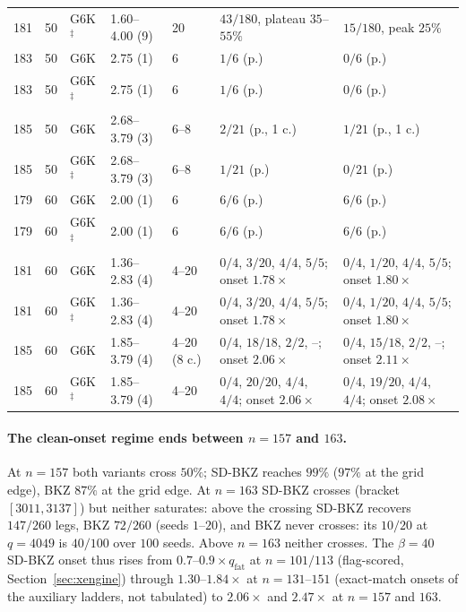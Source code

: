 \documentclass[journal=cic,version=preprint]{iacrj}
\begin{document}
\begin{table}[tbp]
\begin{tabular}{rrlllll}
181 & 50 & G6K$^\ddagger$ & 1.60--4.00 (9) & 20 & $43/180$, plateau $35$--$55\%$ & $15/180$, peak $25\%$ \\
183 & 50 & G6K & 2.75 (1) & 6 & $1/6$ (p.) & $0/6$ (p.) \\
183 & 50 & G6K$^\ddagger$ & 2.75 (1) & 6 & $1/6$ (p.) & $0/6$ (p.) \\
185 & 50 & G6K & 2.68--3.79 (3) & 6--8 & $2/21$ (p., 1 c.) & $1/21$ (p., 1 c.) \\
185 & 50 & G6K$^\ddagger$ & 2.68--3.79 (3) & 6--8 & $1/21$ (p.) & $0/21$ (p.) \\
\midrule
179 & 60 & G6K & 2.00 (1) & 6 & $6/6$ (p.) & $6/6$ (p.) \\
179 & 60 & G6K$^\ddagger$ & 2.00 (1) & 6 & $6/6$ (p.) & $6/6$ (p.) \\
181 & 60 & G6K & 1.36--2.83 (4) & 4--20 & $0/4$, $3/20$, $4/4$, $5/5$; onset $1.78\times$ & $0/4$, $1/20$, $4/4$, $5/5$; onset $1.80\times$ \\
181 & 60 & G6K$^\ddagger$ & 1.36--2.83 (4) & 4--20 & $0/4$, $3/20$, $4/4$, $5/5$; onset $1.78\times$ & $0/4$, $1/20$, $4/4$, $5/5$; onset $1.80\times$ \\
185 & 60 & G6K & 1.85--3.79 (4) & 4--20 (8 c.) & $0/4$, $18/18$, $2/2$, --; onset $2.06\times$ & $0/4$, $15/18$, $2/2$, --; onset $2.11\times$ \\
185 & 60 & G6K$^\ddagger$ & 1.85--3.79 (4) & 4--20 & $0/4$, $20/20$, $4/4$, $4/4$; onset $2.06\times$ & $0/4$, $19/20$, $4/4$, $4/4$; onset $2.08\times$ \\
\bottomrule
\end{tabular}
\end{table}

\paragraph{The clean-onset regime ends between $n=157$ and $163$.}
At $n=157$ both variants cross $50\%$; SD-BKZ reaches $99\%$ ($97\%$ at the grid edge), BKZ $87\%$ at the grid edge. At $n=163$ SD-BKZ
crosses (bracket $[3011,3137]$) but neither saturates: above the crossing
SD-BKZ recovers $147/260$ legs, BKZ $72/260$ (seeds $1$--$20$), and BKZ
never crosses: its $10/20$ at $q=4049$ is $40/100$ over $100$ seeds. Above $n=163$ neither crosses. The $\beta=40$ SD-BKZ onset thus
rises from $0.7$--$0.9\times q_\mathrm{fat}$ at $n=101/113$
(flag-scored, Section~\ref{sec:xengine}) through $1.30$--$1.84\times$ at $n=131$--$151$
(exact-match onsets of the auxiliary ladders, not tabulated) to $2.06\times$ and $2.47\times$ at $n=157$ and
$163$.
\end{document}
